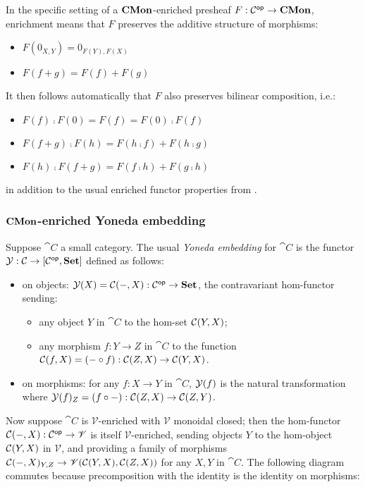 In the specific setting of a $\mathbf{CMon}$-enriched presheaf $F: \mathcal{C}^{\mathsf{op}} \to \mathbf{CMon}$, enrichment means that $F$
preserves the additive structure of morphisms:
\begin{itemize}
\item $F(0_{X,Y}) = 0_{F(Y),F(X)}$
\item $F(f + g) = F(f) + F(g)$
\end{itemize}
It then follows automatically that $F$ also preserves bilinear composition, i.e.:
\begin{itemize}
\item $F(f) \comp F(0) = F(f) = F(0) \comp F(f)$
\item $F(f + g) \comp F(h) = F(h \comp f) + F(h \comp g)$
\item $F(h) \comp F(f + g) = F(f \comp h) + F(g \comp h)$
\end{itemize}
in addition to the usual enriched functor properties from .

\subsubsection{$\mathbf{CMon}$-enriched Yoneda embedding}

Suppose $\cat{C}$ a small category. The usual \emph{Yoneda embedding} for $\cat{C}$ is the functor $\mathcal{Y}:
\mathcal{C} \to [\mathcal{C}^{\mathsf{op}},\mathbf{Set}]$ defined as follows:
\begin{itemize}
\item on objects: $\mathcal{Y}(X) = {\mathcal{C}}(-,X): \mathcal{C}^{\mathsf{op}} \to \mathbf{Set}$, the contravariant hom-functor
sending:
   \begin{itemize}
   \item any object $Y$ in $\cat{C}$ to the hom-set ${\mathcal{C}}(Y,X)$;
   \item any morphism $f: Y \to Z$ in $\cat{C}$ to the function ${\mathcal{C}}(f,X) = (- \circ f):
   {\mathcal{C}}(Z,X) \to {\mathcal{C}}(Y,X)$.
   \end{itemize}
\item on morphisms: for any $f: X \to Y$ in $\cat{C}$, $\mathcal{Y}(f)$ is the natural transformation where
$\mathcal{Y}(f)_Z = (f \circ -): {\mathcal{C}}(Z,X) \to {\mathcal{C}}(Z,Y)$.
\end{itemize}

\noindent Now suppose $\cat{C}$ is $\mathscr{V}$-enriched with $\mathscr{V}$ monoidal closed; then the
hom-functor ${\mathcal{C}}(-,X): \mathcal{C}^{\mathsf{op}} \to \mathscr{V}$ is itself $\mathscr{V}$-enriched, sending
objects $Y$ to the hom-object ${\mathcal{C}}(Y,X)$ in $\mathscr{V}$, and providing a family of morphisms
${\mathcal{C}}(-,X)_{Y,Z} \to {\mathscr{V}}({\mathcal{C}}(Y,X),{\mathcal{C}}(Z,X))$ for any $X, Y$ in
$\cat{C}$. The following diagram commutes because precomposition with the identity is the identity on
morphisms:

